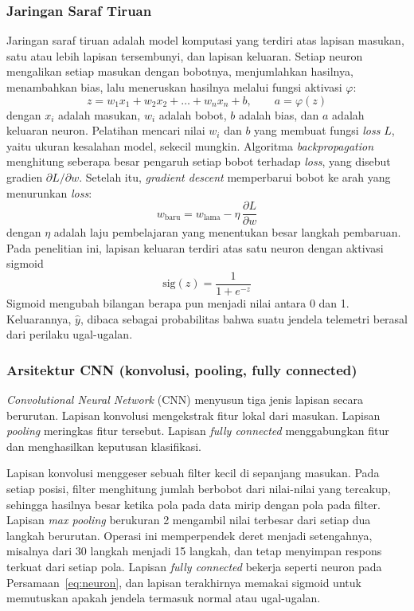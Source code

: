 \subsubsection{Jaringan Saraf Tiruan}
Jaringan saraf tiruan adalah model komputasi yang terdiri atas lapisan masukan, satu atau lebih lapisan tersembunyi, dan lapisan keluaran. Setiap neuron mengalikan setiap masukan dengan bobotnya, menjumlahkan hasilnya, menambahkan bias, lalu meneruskan hasilnya melalui fungsi aktivasi $\varphi$:
\begin{equation}
  z = w_{1}x_{1} + w_{2}x_{2} + \dots + w_{n}x_{n} + b, \qquad a = \varphi(z)
  \label{eq:neuron}
\end{equation}
dengan $x_{i}$ adalah masukan, $w_{i}$ adalah bobot, $b$ adalah bias, dan $a$ adalah keluaran neuron. Pelatihan mencari nilai $w_{i}$ dan $b$ yang membuat fungsi \textit{loss} $L$, yaitu ukuran kesalahan model, sekecil mungkin. Algoritma \textit{backpropagation} menghitung seberapa besar pengaruh setiap bobot terhadap \textit{loss}, yang disebut gradien $\partial L/\partial w$. Setelah itu, \textit{gradient descent} memperbarui bobot ke arah yang menurunkan \textit{loss}:
\begin{equation}
  w_{\mathrm{baru}} = w_{\mathrm{lama}} - \eta\,\frac{\partial L}{\partial w}
  \label{eq:gd}
\end{equation}
dengan $\eta$ adalah laju pembelajaran yang menentukan besar langkah pembaruan. Pada penelitian ini, lapisan keluaran terdiri atas satu neuron dengan aktivasi sigmoid
\begin{equation}
  \mathrm{sig}(z) = \frac{1}{1 + e^{-z}}
  \label{eq:sigmoid}
\end{equation}
Sigmoid mengubah bilangan berapa pun menjadi nilai antara 0 dan 1. Keluarannya, $\hat{y}$, dibaca sebagai probabilitas bahwa suatu jendela telemetri berasal dari perilaku ugal-ugalan.

\subsubsection{Arsitektur CNN (konvolusi, pooling, fully connected)}
\textit{Convolutional Neural Network} (CNN) menyusun tiga jenis lapisan secara berurutan. Lapisan konvolusi mengekstrak fitur lokal dari masukan. Lapisan \textit{pooling} meringkas fitur tersebut. Lapisan \textit{fully connected} menggabungkan fitur dan menghasilkan keputusan klasifikasi.

Lapisan konvolusi menggeser sebuah filter kecil di sepanjang masukan. Pada setiap posisi, filter menghitung jumlah berbobot dari nilai-nilai yang tercakup, sehingga hasilnya besar ketika pola pada data mirip dengan pola pada filter. Lapisan \textit{max pooling} berukuran 2 mengambil nilai terbesar dari setiap dua langkah berurutan. Operasi ini memperpendek deret menjadi setengahnya, misalnya dari 30 langkah menjadi 15 langkah, dan tetap menyimpan respons terkuat dari setiap pola. Lapisan \textit{fully connected} bekerja seperti neuron pada Persamaan~\ref{eq:neuron}, dan lapisan terakhirnya memakai sigmoid untuk memutuskan apakah jendela termasuk normal atau ugal-ugalan.

